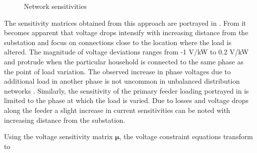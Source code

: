 \begin{figure}[]
	\centering
	\hfill
	\caption{Network sensitivities}
	\label{fig:sensitivities}
\end{figure}

The sensitivity matrices obtained from this approach are portrayed in . From  it becomes apparent that voltage drops intensify with increasing distance from the substation and focus on connections close to the location where the load is altered. The magnitude of voltage deviations ranges from -1 V/kW to 0.2 V/kW and protrude when the particular household is connected to the same phase as the point of load variation. The observed increase in phase voltages due to additional load in another phase is not uncommon in unbalanced distribution networks \cite{Richardson2012}. Similarly, the sensitivity of the primary feeder loading portrayed in  is limited to the phase at which the load is varied. Due to losses and voltage drops along the feeder a slight increase in current sensitivities can be noted with increasing distance from the substation. 

\newpage
Using the voltage sensitivity matrix $\bm{\mu}$, the voltage constraint equations transform to

